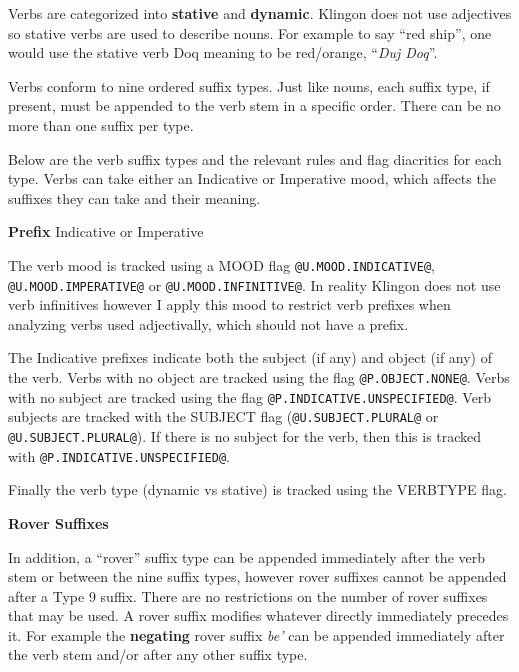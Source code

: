 \documentclass[11pt]{article}
\begin{document}
Verbs are categorized into \textbf{stative} and \textbf{dynamic}. Klingon does not use adjectives so stative verbs are used to describe nouns. For example to say ``red ship'', one would use the stative verb Doq meaning to be red/orange, ``\textit{Duj Doq}''.

Verbs conform to nine ordered suffix types. Just like nouns, each suffix type, if present, must be appended to the verb stem in a specific order. There can be no more than one suffix per type.

Below are the verb suffix types and the relevant rules and flag diacritics for each type. Verbs can take either an Indicative or Imperative mood, which affects the suffixes they can take and their meaning.

\textbf{Prefix} Indicative or Imperative

The verb mood is tracked using a MOOD flag \texttt{@U.MOOD.INDICATIVE@}, \texttt{@U.MOOD.IMPERATIVE@} or \texttt{@U.MOOD.INFINITIVE@}. In reality Klingon does not use verb infinitives however I apply this mood to restrict verb prefixes when analyzing verbs used adjectivally, which should not have a prefix.

The Indicative prefixes indicate both the subject (if any) and object (if any) of the verb. Verbs with no object are tracked using the flag \texttt{@P.OBJECT.NONE@}. Verbs with no subject are tracked using the flag \texttt{@P.INDICATIVE.UNSPECIFIED@}. Verb subjects are tracked with the SUBJECT flag (\texttt{@U.SUBJECT.PLURAL@} or \texttt{@U.SUBJECT.PLURAL@}). If there is no subject for the verb, then this is tracked with \texttt{@P.INDICATIVE.UNSPECIFIED@}.

Finally the verb type (dynamic vs stative) is tracked using the VERBTYPE flag.

\textbf{Rover Suffixes}

In addition, a ``rover'' suffix type can be appended immediately after the verb stem or between the nine suffix types, however rover suffixes cannot be appended after a Type 9 suffix. There are no restrictions on the number of rover suffixes that may be used. A rover suffix modifies whatever directly immediately precedes it. For example the \textbf{negating} rover suffix \textit{be'} can be appended immediately after the verb stem and/or after any other suffix type.
\end{document}
